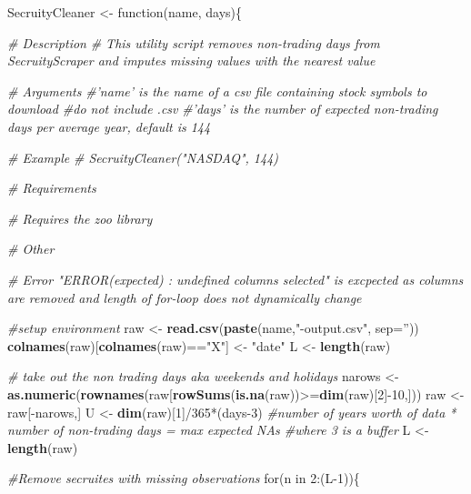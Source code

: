 \documentclass[]{elsarticle} %
\newenvironment{Shaded}{\begin{snugshade}}{\end{snugshade}}
\newcommand{\KeywordTok}[1]{\textcolor[rgb]{0.13,0.29,0.53}{\textbf{{#1}}}}
\newcommand{\DataTypeTok}[1]{\textcolor[rgb]{0.13,0.29,0.53}{{#1}}}
\newcommand{\DecValTok}[1]{\textcolor[rgb]{0.00,0.00,0.81}{{#1}}}
\newcommand{\StringTok}[1]{\textcolor[rgb]{0.31,0.60,0.02}{{#1}}}
\newcommand{\CommentTok}[1]{\textcolor[rgb]{0.56,0.35,0.01}{\textit{{#1}}}}
\newcommand{\NormalTok}[1]{{#1}}
\begin{document}
\begin{Shaded}
\begin{Highlighting}[]
\NormalTok{SecruityCleaner <-}\StringTok{ }\NormalTok{function(name, days)\{}

\CommentTok{# Description}
\CommentTok{# This utility script removes non-trading days from SecruityScraper and imputes missing values with the nearest value }

\CommentTok{# Arguments}
\CommentTok{#'name' is the name of a csv file containing stock symbols to download #do not include .csv}
\CommentTok{#'days' is the number of expected non-trading days per average year, default is 144}

\CommentTok{# Example}
\CommentTok{# SecruityCleaner("NASDAQ", 144)}

\CommentTok{# Requirements}

\CommentTok{# Requires the zoo library}

\CommentTok{# Other}

\CommentTok{# Error "ERROR(expected) : undefined columns selected" is excpected as columns are removed and length of for-loop does not dynamically change}

\CommentTok{#setup environment}
\NormalTok{raw <-}\StringTok{ }\KeywordTok{read.csv}\NormalTok{(}\KeywordTok{paste}\NormalTok{(name,}\StringTok{"-output.csv"}\NormalTok{, }\DataTypeTok{sep=}\StringTok{''}\NormalTok{))}
\KeywordTok{colnames}\NormalTok{(raw)[}\KeywordTok{colnames}\NormalTok{(raw)==}\StringTok{"X"}\NormalTok{] <-}\StringTok{ "date"}
\NormalTok{L <-}\StringTok{ }\KeywordTok{length}\NormalTok{(raw)}

\CommentTok{# take out the non trading days aka weekends and holidays}
\NormalTok{narows <-}\StringTok{ }\KeywordTok{as.numeric}\NormalTok{(}\KeywordTok{rownames}\NormalTok{(raw[}\KeywordTok{rowSums}\NormalTok{(}\KeywordTok{is.na}\NormalTok{(raw))>=}\KeywordTok{dim}\NormalTok{(raw)[}\DecValTok{2}\NormalTok{]-}\DecValTok{10}\NormalTok{,])) }
\NormalTok{raw <-}\StringTok{ }\NormalTok{raw[-narows,]}
\NormalTok{U <-}\StringTok{ }\KeywordTok{dim}\NormalTok{(raw)[}\DecValTok{1}\NormalTok{]/}\DecValTok{365}\NormalTok{*(days}\DecValTok{-3}\NormalTok{) }\CommentTok{#number of years worth of data * number of non-trading days = max expected NAs #where 3 is a buffer}
\NormalTok{L <-}\StringTok{ }\KeywordTok{length}\NormalTok{(raw)}

\CommentTok{#Remove secruites with missing observations}
\NormalTok{for(n in }\DecValTok{2}\NormalTok{:(L}\DecValTok{-1}\NormalTok{))\{}


\end{Highlighting}
\end{Shaded}
\end{document}
